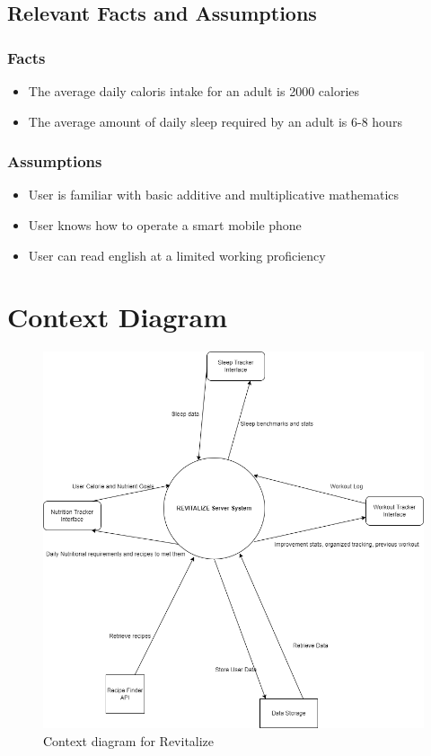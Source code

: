 \documentclass[12pt,letterpaper]{article}
\begin{document}
\subsection{Relevant Facts and Assumptions}
\subsubsection{Facts}
\begin{itemize}
\item The average daily caloris intake for an adult is 2000 calories
\item The average amount of daily sleep required by an adult is 6-8 hours
\end{itemize}

\subsubsection{Assumptions}
\begin{itemize}
\item User is familiar with basic additive and multiplicative mathematics
\item User knows how to operate a smart mobile phone
\item User can read english at a limited working proficiency
\end{itemize}
	
\section{Context Diagram}
\begin{figure}[H]
    \centering
    \includegraphics[scale=0.5]{cont_diag.png}
    \caption{\textcolor{black}Context diagram for Revitalize}
\end{figure}
\end{document}

